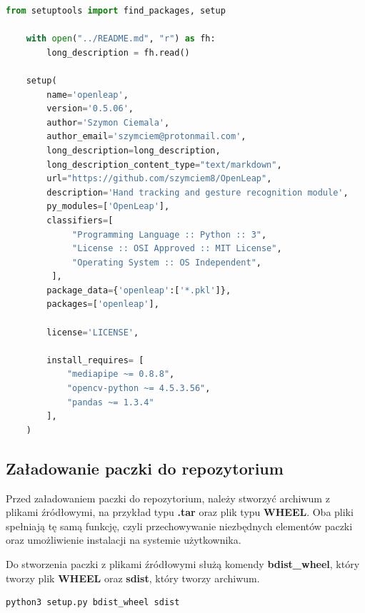 \begin{lstlisting}[language=python, style=programming, captionpos=b, caption={Sprawdzenie poprawności}]
    from setuptools import find_packages, setup

    with open("../README.md", "r") as fh:
        long_description = fh.read()
    
    setup(
        name='openleap', 
        version='0.5.06',
        author='Szymon Ciemala',
        author_email='szymciem@protonmail.com',
        long_description=long_description,
        long_description_content_type="text/markdown",
        url="https://github.com/szymciem8/OpenLeap",
        description='Hand tracking and gesture recognition module', 
        py_modules=['OpenLeap'], 
        classifiers=[
             "Programming Language :: Python :: 3",
             "License :: OSI Approved :: MIT License",
             "Operating System :: OS Independent",
         ],
        package_data={'openleap':['*.pkl']},
        packages=['openleap'],
    
        license='LICENSE',
    
        install_requires= [
            "mediapipe ~= 0.8.8",
            "opencv-python ~= 4.5.3.56", 
            "pandas ~= 1.3.4"
        ],    
    )
\end{lstlisting}

\subsection{Załadowanie paczki do repozytorium}

\quad Przed załadowaniem paczki do repozytorium, należy stworzyć archiwum z plikami źródłowymi, na przykład typu \textbf{.tar} oraz plik typu \textbf{WHEEL}. Oba pliki spełniają tę samą funkcję, czyli przechowywanie niezbędnych elementów paczki oraz umożliwienie instalacji na systemie użytkownika.

\quad Do stworzenia paczki z plikami źródłowymi służą komendy \textbf{bdist\_wheel}, który tworzy plik \textbf{WHEEL} oraz \textbf{sdist}, który tworzy archiwum. \newline

\begin{lstlisting}[language=python, style=command, captionpos=b, caption={Przygotowanie plików źródłowych}]
python3 setup.py bdist_wheel sdist
\end{lstlisting}

